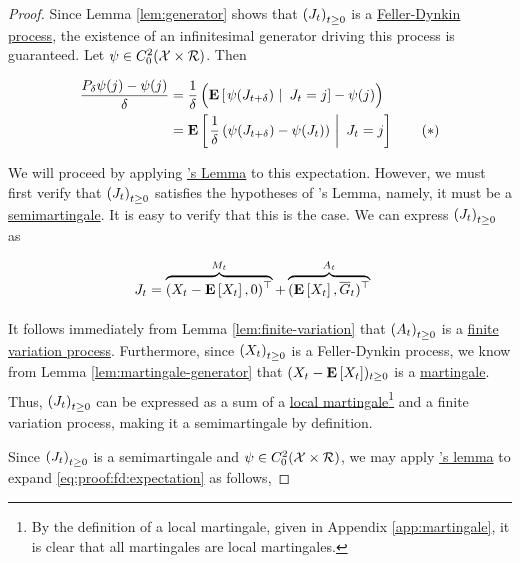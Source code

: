 \begin{proof}
  Since Lemma \ref{lem:generator} shows that $\indexedabove{t}{J}$ is
  a \hyperref[def:fd]{Feller-Dynkin process}, the existence of an
  infinitesimal generator driving this process is guaranteed.
  Let $\psi\in C^2_0(\mathcal{X}\times\returnspace)$. Then

  \begin{align*}
    \frac{P_\delta\psi(j) - \psi(j)}{\delta}
    &=
      \frac{1}{\delta}\left(\ConditionExpect{\psi(J_{t+\delta})}{J_t =
      j} - \psi(j)\right)\\ 
    &= \ConditionExpect{\frac{1}{\delta}\left(\psi(J_{t+\delta}) -
      \psi(J_t)\right)}{J_t = j}\label{eq:proof:fd:expectation}\tag{$*$}\\
  \end{align*}

  We will proceed by applying \hyperref[app:ito]{\Ito's Lemma} to this
  expectation. However, we must first verify that $\indexedabove{t}{J}$
  satisfies the hypotheses of \Ito's Lemma, namely, it must be a
  \hyperref[app:martingale]{semimartingale}. It is easy to verify that this is
  the case. We can express $\indexedabove{t}{J}$ as

  \begin{align*}
    J_t &= \overbrace{(X_t - \Expect{X_t}, 0)^\top}^{M_t} + \overbrace{(\Expect{X_t},
      \overline{G}_t)^\top}^{A_t}
  \end{align*}

  It follows immediately from Lemma \ref{lem:finite-variation} that
  $\indexedabove{t}{A}$ is a \hyperref[app:finite-variation]{finite variation
  process}. Furthermore, since $\indexedabove{t}{X}$ is a Feller-Dynkin
  process, we know from Lemma \ref{lem:martingale-generator} that $(X_t -
  \Expect{X_t})_{t\geq 0}$ is a \hyperref[app:martingale]{martingale}. Thus,
  $\indexedabove{t}{J}$ can be expressed as a sum of a
  \hyperref[app:martingale]{local martingale}\footnote{By the definition of a
  local martingale, given in Appendix \ref{app:martingale}, it is clear that all
  martingales are local martingales.} and a finite variation process, making it a
  semimartingale by definition.

  Since $\indexedabove{t}{J}$ is a semimartingale and $\psi\in
  C_0^2(\mathcal{X}\times\returnspace)$, we may apply \hyperref[app:ito]{\Ito's
  lemma} to expand \eqref{eq:proof:fd:expectation} as follows,


\end{proof}

